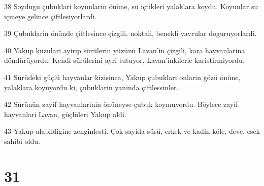 \par 38 Soydugu çubuklari koyunlarin önüne, su içtikleri yalaklara koydu. Koyunlar su içmeye gelince çiftlesiyorlardi.
\par 39 Çubuklarin önünde çiftlesince çizgili, noktali, benekli yavrular doguruyorlardi.
\par 40 Yakup kuzulari ayirip sürülerin yüzünü Lavan'in çizgili, kara hayvanlarina döndürüyordu. Kendi sürülerini ayri tutuyor, Lavan'inkilerle karistirmiyordu.
\par 41 Sürüdeki güçlü hayvanlar kizisinca, Yakup çubuklari onlarin gözü önüne, yalaklara koyuyordu ki, çubuklarin yaninda çiftlessinler.
\par 42 Sürünün zayif hayvanlarinin önüneyse çubuk koymuyordu. Böylece zayif hayvanlari Lavan, güçlüleri Yakup aldi.
\par 43 Yakup alabildigine zenginlesti. Çok sayida sürü, erkek ve kadin köle, deve, esek sahibi oldu.

\chapter{31}

